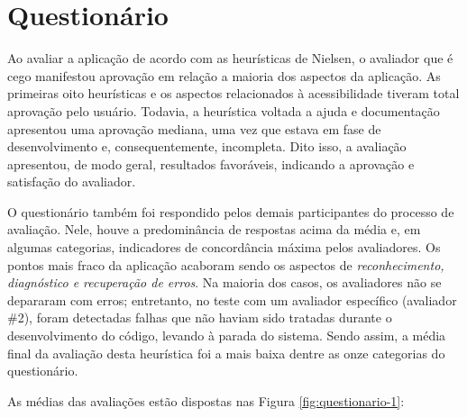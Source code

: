 \section{Questionário}

Ao avaliar a aplicação de acordo com as heurísticas de Nielsen, o avaliador que é cego manifestou aprovação em relação a maioria dos aspectos da aplicação.  As primeiras oito heurísticas e os aspectos relacionados à acessibilidade tiveram total aprovação pelo usuário. Todavia, a heurística voltada a ajuda e documentação apresentou uma aprovação mediana, uma vez que estava em fase de desenvolvimento e, consequentemente, incompleta. Dito isso, a avaliação apresentou, de modo geral, resultados favoráveis, indicando a aprovação e satisfação do avaliador.

O questionário também foi respondido pelos demais participantes do processo de avaliação. Nele, houve a predominância de respostas acima da média e, em algumas categorias, indicadores de concordância máxima pelos avaliadores. Os pontos mais fraco da aplicação acaboram sendo os aspectos de \emph{reconhecimento, diagnóstico e recuperação de erros}. Na maioria dos casos, os avaliadores não se depararam com erros; entretanto, no teste com um avaliador específico (avaliador \#2), foram detectadas falhas que não haviam sido tratadas durante o desenvolvimento do código, levando à parada do sistema. Sendo assim, a média final da avaliação desta heurística foi a mais baixa dentre as onze categorias do questionário.

As médias das avaliações estão dispostas nas Figura \ref{fig:questionario-1}:

